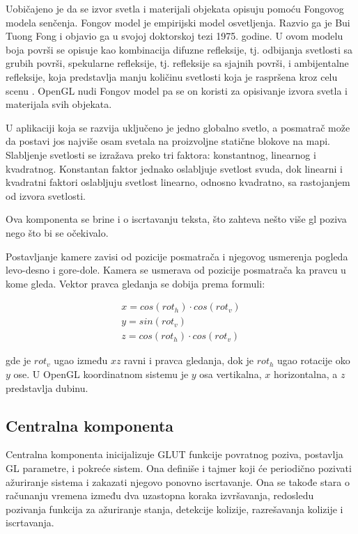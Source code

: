 \documentclass[12pt,oneside]{memoir}
\begin{document}
Uobičajeno je da se izvor svetla i materijali objekata opisuju pomoću Fongovog modela senčenja. 
Fongov model je empirijski model osvetljenja. Razvio ga je Bui Tuong Fong i objavio ga u svojoj doktorskoj tezi 1975. godine.
U ovom modelu boja površi se opisuje kao kombinacija difuzne refleksije, tj. odbijanja svetlosti sa grubih površi, 
spekularne refleksije, tj. refleksije sa sjajnih površi, i ambijentalne refleksije, koja predstavlja manju količinu svetlosti 
koja je raspršena kroz celu scenu \cite{Phong}.
OpenGL nudi Fongov model pa se on koristi za opisivanje izvora svetla i materijala svih objekata.


U aplikaciji koja se razvija uključeno je jedno globalno svetlo, a posmatrač može da postavi jos najviše osam svetala na 
proizvoljne statične blokove na mapi. 
Slabljenje svetlosti se izražava preko tri faktora: konstantnog, linearnog i kvadratnog.
Konstantan faktor jednako oslabljuje svetlost svuda, dok linearni i kvadratni faktori oslabljuju svetlost
linearno, odnosno kvadratno, sa rastojanjem od izvora svetlosti.

Ova komponenta se brine i o iscrtavanju teksta, što zahteva nešto više gl poziva nego što bi se očekivalo.

Postavljanje kamere zavisi od pozicije posmatrača i njegovog usmerenja pogleda levo-desno i gore-dole.
Kamera se usmerava od pozicije posmatrača ka pravcu u kome gleda.
Vektor pravca gledanja se dobija prema formuli:

\begin{equation}
\label{eq:camera}
\begin{split}
x = cos(rot_h) \cdot cos(rot_v) \\
y = sin(rot_v) \\
z = cos(rot_h) \cdot  cos(rot_v)	
\end{split}
\end{equation}


\noindent gde je $rot_v$ ugao između $xz$ ravni i pravca gledanja, dok je $rot_h$ ugao rotacije oko $y$ ose.
U OpenGL koordinatnom sistemu je $y$ osa vertikalna, $x$ horizontalna, a $z$ predstavlja dubinu.

\subsection{Centralna komponenta}

Centralna komponenta inicijalizuje GLUT funkcije povratnog poziva, postavlja GL parametre, i pokreće sistem.
Ona definiše i tajmer koji će periodično pozivati ažuriranje sistema i zakazati njegovo ponovno iscrtavanje. 
Ona se takođe stara o računanju vremena između dva uzastopna koraka izvršavanja, redosledu pozivanja funkcija za ažuriranje stanja,
detekcije kolizije, razrešavanja kolizije i iscrtavanja.
\end{document}
